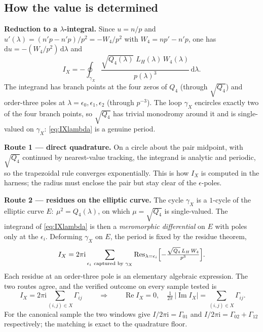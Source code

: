 \documentclass[11pt]{article}
\newcommand{\ii}{\mathrm i}
\newcommand{\dd}{\mathrm d}
\newcommand{\Res}{\operatorname{Res}}
\newcommand{\im}{\operatorname{Im}}
\newcommand{\re}{\operatorname{Re}}
\begin{document}
\subsection{How the value is determined}

\textbf{Reduction to a $\lambda$-integral.} Since $u=n/p$ and
$u'(\lambda)=(n'p-n'p)/p^2=-W_4/p^2$ with $W_4=np'-n'p$, one has
$\dd u=-(W_4/p^2)\,\dd\lambda$ and
\begin{equation}
\label{eq:IXlambda}
 I_X=-\oint_{\gamma_X}\frac{\sqrt{Q_4(\lambda)}\;L_H(\lambda)\,W_4(\lambda)}
 {p(\lambda)^3}\,\dd\lambda .
\end{equation}
The integrand has branch points at the four zeros of $Q_4$ (through
$\sqrt{Q_4}$) and order-three poles at $\lambda=\epsilon_0,\epsilon_1,\epsilon_2$
(through $p^{-3}$). The loop $\gamma_X$ encircles exactly two of the four branch
points, so $\sqrt{Q_4}$ has trivial monodromy around it and is single-valued on
$\gamma_X$: \eqref{eq:IXlambda} is a genuine period.

\textbf{Route 1 --- direct quadrature.} On a circle about the pair midpoint, with
$\sqrt{Q_4}$ continued by nearest-value tracking, the integrand is analytic and
periodic, so the trapezoidal rule converges exponentially. This is how $I_X$ is
computed in the harness; the radius must enclose the pair but stay clear of the
$\epsilon$-poles.

\textbf{Route 2 --- residues on the elliptic curve.} The cycle $\gamma_X$ is a
$1$-cycle of the elliptic curve $E:\ \mu^2=Q_4(\lambda)$, on which
$\mu=\sqrt{Q_4}$ is single-valued. The integrand of \eqref{eq:IXlambda} is then a
\emph{meromorphic differential} on $E$ with poles only at the $\epsilon_i$.
Deforming $\gamma_X$ on $E$, the period is fixed by the residue theorem,
\begin{equation}
\label{eq:residue}
 I_X=2\pi\ii\sum_{\epsilon_i\ \text{captured by }\gamma_X}
 \Res_{\lambda=\epsilon_i}
 \Bigl[-\tfrac{\sqrt{Q_4}\,L_H\,W_4}{p^{3}}\Bigr].
\end{equation}
Each residue at an order-three pole is an elementary algebraic expression. The
two routes agree, and the verified outcome on every sample tested is
\begin{equation}
\label{eq:IXvalue}
 \boxed{\;I_X=2\pi\ii\sum_{(i,j)\in X}\Gamma_{ij}\;}
 \qquad\Longrightarrow\qquad
 \re I_X=0,\quad
 \tfrac{1}{2\pi}\,|\im I_X|=\sum_{(i,j)\in X}\Gamma_{ij}.
\end{equation}
For the canonical sample the two windows give
$I/2\pi\ii=\Gamma_{01}$ and $I/2\pi\ii=\Gamma_{02}+\Gamma_{12}$ respectively;
the matching is exact to the quadrature floor.
\end{document}
